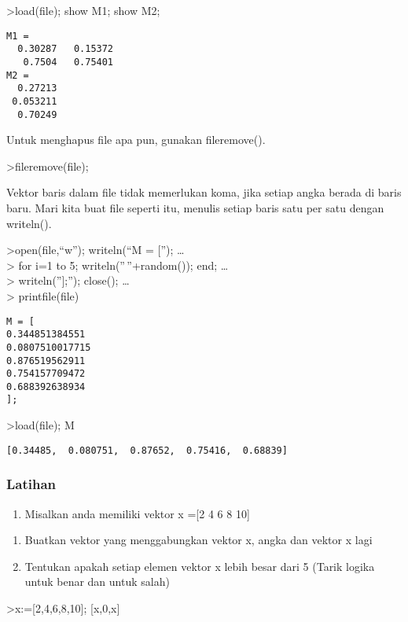 \documentclass[
]{book}
\providecommand{\tightlist}{%
  \setlength{\itemsep}{0pt}\setlength{\parskip}{0pt}}
\begin{document}
\textgreater load(file); show M1; show M2;

\begin{verbatim}
M1 = 
  0.30287   0.15372 
   0.7504   0.75401 
M2 = 
  0.27213 
 0.053211 
  0.70249 
\end{verbatim}

Untuk menghapus file apa pun, gunakan fileremove().

\textgreater fileremove(file);

Vektor baris dalam file tidak memerlukan koma, jika setiap angka berada di baris baru. Mari kita buat file seperti itu, menulis setiap baris satu per satu dengan writeln().

\textgreater open(file,``w''); writeln(``M = {[}''); \ldots{}\\
\textgreater{} for i=1 to 5; writeln(''\,''+random()); end; \ldots{}\\
\textgreater{} writeln(''{]};''); close(); \ldots{}\\
\textgreater{} printfile(file)

\begin{verbatim}
M = [
0.344851384551
0.0807510017715
0.876519562911
0.754157709472
0.688392638934
];
\end{verbatim}

\textgreater load(file); M

\begin{verbatim}
[0.34485,  0.080751,  0.87652,  0.75416,  0.68839]
\end{verbatim}

\subsubsection{Latihan}\label{latihan-5}

\begin{enumerate}
\def\labelenumi{\arabic{enumi}.}
\tightlist
\item
  Misalkan anda memiliki vektor x ={[}2 4 6 8 10{]}
\end{enumerate}

\begin{enumerate}
\def\labelenumi{\alph{enumi}.}
\item
  Buatkan vektor yang menggabungkan vektor x, angka dan vektor x lagi
\item
  Tentukan apakah setiap elemen vektor x lebih besar dari 5 (Tarik logika untuk benar dan untuk salah)
\end{enumerate}

\textgreater x:={[}2,4,6,8,10{]}; {[}x,0,x{]}
\end{document}
